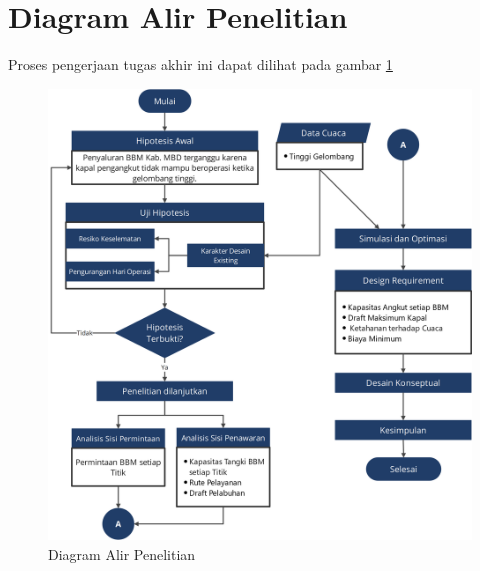 \section{Diagram Alir Penelitian}
\label{sec:diagram-alir}

Proses pengerjaan tugas akhir ini dapat dilihat pada gambar \ref{fig:diagramkerja} 


\begin{figure}[!ht]
  \centering
  \includegraphics[scale=0.75]{gambar/FC_TA_19-Jan.png}
  \caption{Diagram Alir Penelitian}
  \label{fig:diagramkerja}
\end{figure}